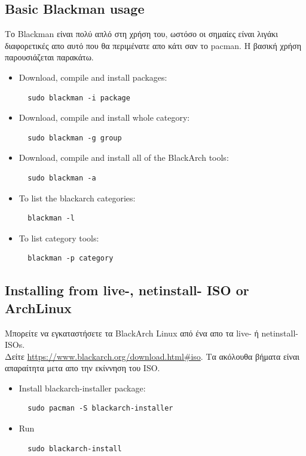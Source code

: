 \documentclass[a4paper, oneside, 11pt]{book}
\begin{document}
\subsection{Basic Blackman usage} Το Blackman είναι πολύ απλό στη χρήση του, ωστόσο
οι σημαίες είναι λιγάκι διαφορετικές απο αυτό που θα περιμένατε απο κάτι σαν το pacman.
Η βασική χρήση παρουσιάζεται παρακάτω. 
\begin{itemize}
\item Download, compile and install packages:
\begin{lstlisting}
  sudo blackman -i package
\end{lstlisting}

\item Download, compile and install whole category:
\begin{lstlisting}
  sudo blackman -g group
\end{lstlisting}

\item Download, compile and install all of the BlackArch tools:
\begin{lstlisting}
  sudo blackman -a
\end{lstlisting}

\item To list the blackarch categories:
\begin{lstlisting}
  blackman -l
\end{lstlisting}

\item To list category tools:
\begin{lstlisting}
  blackman -p category
\end{lstlisting}

\end{itemize}

\subsection{Installing from live-, netinstall- ISO or ArchLinux}
Μπορείτε να εγκαταστήσετε τα BlackArch Linux από ένα απο τα live- ή netinstall-ISOs.\\Δείτε
\url{https://www.blackarch.org/download.html#iso}. Τα ακόλουθα βήματα είναι
απαραίτητα μετα απο την εκίννηση του ISO.
\begin{itemize}
\item Install blackarch-installer package:
\begin{lstlisting}
  sudo pacman -S blackarch-installer
\end{lstlisting}

\item Run
\begin{lstlisting}
  sudo blackarch-install
\end{lstlisting}

\end{itemize}
\end{document}
